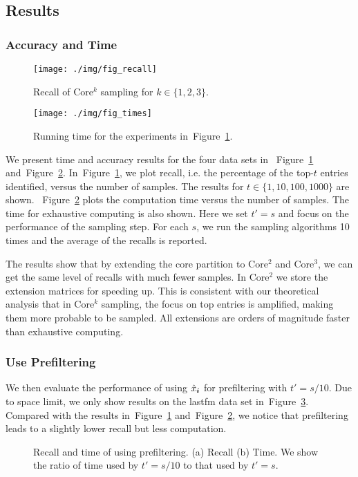 \documentclass[letterpaper]{article}
\newcommand{\V}[1]{{\boldsymbol{{\MakeLowercase{#1}}}}}
\newcommand{\predx}{\hat{x}_{\V{i}}}
\newcommand{\Fig}[1]{Figure~\ref{fig:#1}}
\begin{document}
\subsection{Results}
\subsubsection{Accuracy and Time}

\begin{figure}[!]
  \centering
  \texttt{[image: ./img/fig\_recall]}\\
  \caption{Recall of Core$^k$ sampling for $k\in\{1,2,3\}$.}
  \label{fig:recall}
\end{figure}
\begin{figure}[!]
    \centering
    \texttt{[image: ./img/fig\_times]}\\
    \caption{Running time for the experiments in~\Fig{recall}.}
    \label{fig:time}
\end{figure}
We present time and accuracy results for the four data sets in
~\Fig{recall} and~\Fig{time}.
In~\Fig{recall}, we plot recall, i.e. the percentage of the top-$t$ entries identified,
versus the number of samples.
The results for $t\in\{1,10,100,1000\}$ are shown.
~\Fig{time} plots the computation time versus the number of samples.
The time for exhaustive computing is also shown.
Here we set $t'=s$ and focus on the performance of the sampling step.
For each $s$, we run the sampling algorithms 10 times and the average of the recalls is reported.

The results show that by extending the core partition to Core$^2$ and Core$^3$,
we can get the same level of recalls with much fewer samples.
In Core$^2$ we store the extension matrices for speeding up.
This is consistent with our theoretical analysis that in Core$^k$ sampling,
the focus on top entries is amplified,
making them more probable to be sampled.
All extensions are orders of magnitude faster than exhaustive computing.

\subsubsection{Use Prefiltering}
We then evaluate the performance of using $\predx$ for prefiltering with $t'=s/10$.
Due to space limit, we only show results on the lastfm data set in~\Fig{lastfm_budget}.
Compared with the results in~\Fig{recall} and~\Fig{time},
we notice that prefiltering leads to a slightly lower recall but less computation.
\begin{figure}[H]
    \centering
\caption{Recall and time of using prefiltering.
        (a) Recall (b) Time.
        We show the ratio of time used by $t'=s/10$ to that used by $t'=s$.}
\label{fig:lastfm_budget}
\end{figure}
\end{document}
